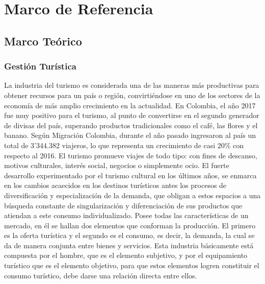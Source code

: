 \documentclass[12pt,letterpaper,openany]{book}
\begin{document}

\chapter{Marco de Referencia}\label{cap.marco_de_referencia}

\section{Marco Teórico}
\subsection{Gestión Turística}
La industria del turismo es considerada una de las maneras más productivas para obtener recursos para un país o región, convirtiéndose en uno de los sectores de la economía de más amplio crecimiento en la actualidad. En Colombia, el año 2017 fue muy positivo para el turismo, al punto de convertirse en el segundo generador de divisas del país, superando productos tradicionales como el café, las flores y el banano. Según Migración Colombia, durante el año pasado ingresaron al país un total de 3’344.382 viajeros, lo que representa un crecimiento de casi 20\% con respecto al 2016\cite{6}.
\vspace{5mm}\newline
El turismo promueve viajes de todo tipo: con fines de descanso, motivos culturales, interés social, negocios o simplemente ocio. El fuerte desarrollo experimentado por el turismo cultural en los últimos años, se enmarca en los cambios acaecidos en los destinos turísticos antes los procesos de diversificación y especialización de la demanda, que obligan a estos espacios a una búsqueda constante de singularización y diferenciación de sus productos que atiendan a este consumo individualizado\cite{7}.
\vspace{5mm}\newline
Posee todas las características de un mercado, en él se hallan dos elementos que conforman la producción. El primero es la oferta turística y el segundo es el consumo, es decir, la demanda, la cual se da de manera conjunta entre bienes y servicios. Esta industria básicamente está compuesta por el hombre, que es el elemento subjetivo, y por el equipamiento turístico que es el elemento objetivo, para que estos elementos logren constituir el consumo turístico, debe darse una relación directa entre ellos\cite{8}. 
\end{document}
